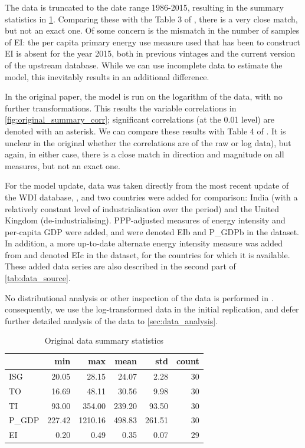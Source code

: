 \documentclass[11pt,a4paper]{article}
\begin{document}
The data is truncated to the date range 1986-2015, resulting in the summary statistics in \cref{tab:original_summary_stats}.
Comparing these with the Table 3 of \cite{panHowIndustrializationTrade2019}, there is a very close match, but not an exact one.
Of some concern is the mismatch in the number of samples of EI: the per capita primary energy use measure used that has been to construct EI is absent for the year 2015, both in previous vintages and the current version of the upstream database.
While we can use incomplete data to estimate the model, this inevitably results in an additional difference.

In the original paper, the model is run on the logarithm of the data, with no further transformations. 
This results the variable correlations in \cref{fig:original_summary_corr}; significant correlations (at the 0.01 level) are denoted with an asterisk.
We can compare these results with Table 4 of \cite{panHowIndustrializationTrade2019}. 
It is unclear in the original whether the correlations are of the raw or log data), but again, in either case, there is a close match in direction and magnitude on all measures, but not an exact one.

For the model update, data was taken directly from the most recent update of the WDI database, \cite{theworldbankWorldDevelopmentIndicators2019}, and two countries were added for comparison: India (with a relatively constant level of industrialisation over the period) and the United Kingdom (de-industrialising). 
PPP-adjusted measures of energy intensity and per-capita GDP were added, and were denoted EIb and P\_GDPb in the dataset. 
In addition, a more up-to-date alternate energy intensity measure was added from \cite{enerdataGlobalEnergyStatistical2019} and denoted EIc in the dataset, for the countries for which it is available.
These added data series are also described in the second part of \cref{tab:data_source}.

No distributional analysis or other inspection of the data is performed in \cite{panHowIndustrializationTrade2019}.
consequently, we use the log-transformed data in the initial replication, and defer further detailed analysis of the data to \cref{sec:data_analysis}.

\begin{table}[tbp]
\centering
\begin{tabular}{lrrrrr}
\toprule
{} &    min &     max &   mean &    std &  count \\
\midrule
ISG   &  20.05 &   28.15 &  24.07 &   2.28 &     30 \\
TO    &  16.69 &   48.11 &  30.56 &   9.98 &     30 \\
TI    &  93.00 &  354.00 & 239.20 &  93.50 &     30 \\
P\_GDP & 227.42 & 1210.16 & 498.83 & 261.51 &     30 \\
EI    &   0.20 &    0.49 &   0.35 &   0.07 &     29 \\
\bottomrule
\end{tabular}
\caption{Original data summary statistics}
\label{tab:original_summary_stats}
\end{table}
\end{document}
